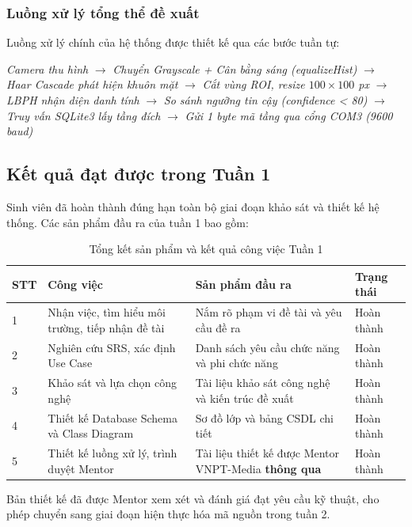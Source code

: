 \documentclass[12pt,a4paper]{article}
\begin{document}
\subsubsection{Luồng xử lý tổng thể đề xuất}

Luồng xử lý chính của hệ thống được thiết kế qua các bước tuần tự:

\begin{center}
    \textit{Camera thu hình}
    $\rightarrow$ \textit{Chuyển Grayscale + Cân bằng sáng (equalizeHist)}
    $\rightarrow$ \textit{Haar Cascade phát hiện khuôn mặt}
    $\rightarrow$ \textit{Cắt vùng ROI, resize $100 \times 100$ px}
    $\rightarrow$ \textit{LBPH nhận diện danh tính}
    $\rightarrow$ \textit{So sánh ngưỡng tin cậy (confidence < 80)}
    $\rightarrow$ \textit{Truy vấn SQLite3 lấy tầng đích}
    $\rightarrow$ \textit{Gửi 1 byte mã tầng qua cổng COM3 (9600 baud)}
\end{center}

\subsection{Kết quả đạt được trong Tuần 1}

Sinh viên đã hoàn thành đúng hạn toàn bộ giai đoạn khảo sát và thiết kế hệ thống. Các sản phẩm đầu ra của tuần 1 bao gồm:

\begin{table}[h!]
\centering
\caption{Tổng kết sản phẩm và kết quả công việc Tuần 1}
\renewcommand{\arraystretch}{1.3}
\begin{tabular}{|m{1cm}|m{5cm}|m{4.5cm}|m{3cm}|}
\hline
\textbf{STT} & \textbf{Công việc} & \textbf{Sản phẩm đầu ra} & \textbf{Trạng thái} \\ \hline
1 & Nhận việc, tìm hiểu môi trường, tiếp nhận đề tài & Nắm rõ phạm vi đề tài và yêu cầu đề ra & Hoàn thành \\ \hline
2 & Nghiên cứu SRS, xác định Use Case & Danh sách yêu cầu chức năng và phi chức năng & Hoàn thành \\ \hline
3 & Khảo sát và lựa chọn công nghệ & Tài liệu khảo sát công nghệ và kiến trúc đề xuất & Hoàn thành \\ \hline
4 & Thiết kế Database Schema và Class Diagram & Sơ đồ lớp và bảng CSDL chi tiết & Hoàn thành \\ \hline
5 & Thiết kế luồng xử lý, trình duyệt Mentor & Tài liệu thiết kế được Mentor VNPT-Media \textbf{thông qua} & Hoàn thành \\ \hline
\end{tabular}
\end{table}

Bản thiết kế đã được Mentor xem xét và đánh giá đạt yêu cầu kỹ thuật, cho phép chuyển sang giai đoạn hiện thực hóa mã nguồn trong tuần 2.
\end{document}
